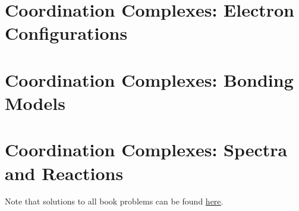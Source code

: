 \documentclass[titlepage]{article}
\begin{document}
\section{Coordination Complexes: Electron Configurations}

\newpage



\section{Coordination Complexes: Bonding Models}

\newpage



\section{Coordination Complexes: Spectra and Reactions}

\newpage



\renewcommand{\leftmark}{References}
\printbibliography[heading=bibintoc]

Note that solutions to all book problems can be found \href{https://www.chem.uci.edu/~lawm/107.html?fbclid=IwAR0mQljnCSONs96ZRMeseJbx-0psD2kslMZfl0nDnpq5SmcAnE0isXZU1C8}{\underline{here}}.
\end{document}
